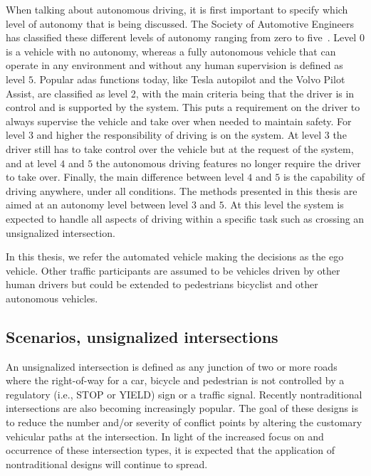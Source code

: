 When talking about autonomous driving, it is first important to specify which level of autonomy that is being discussed. The Society of Automotive Engineers has classified these different levels of autonomy ranging from zero to five~\cite{SAE2021}. Level $0$ is a vehicle with no autonomy, whereas a fully autonomous vehicle that can operate in any environment and without any human supervision is defined as level $5$. Popular \gls{adas} functions today, like Tesla autopilot and the Volvo Pilot Assist, are classified as level 2, with the main criteria being that the driver is in control and is supported by the system. This puts a requirement on the driver to always supervise the vehicle and take over when needed to maintain safety. For level $3$ and higher the responsibility of driving is on the system. At level $3$ the driver still has to take control over the vehicle but at the request of the system, and at level $4$ and $5$ the autonomous driving features no longer require the driver to take over. Finally, the main difference between level $4$ and $5$ is the capability of driving anywhere, under all conditions. 
The methods presented in this thesis are aimed at an autonomy level between level $3$ and $5$. At this level the system is expected to handle all aspects of driving within a specific task such as crossing an unsignalized intersection. 

In this thesis, we refer the automated vehicle making the decisions as the ego vehicle.
Other traffic participants are assumed to be vehicles driven by other human drivers but could be extended to pedestrians bicyclist and other autonomous vehicles. 

\subsection{Scenarios, unsignalized intersections}
An unsignalized intersection is defined as any junction of two or more roads where the right-of-way for a car, bicycle and pedestrian is not controlled by a regulatory (i.e., STOP or YIELD) sign or a traffic signal.
Recently nontraditional intersections are also becoming increasingly popular. The goal of these designs is to reduce the number and/or severity of conflict points by altering the customary vehicular paths at the intersection. In light of the increased focus on and occurrence of these intersection types, it is expected that the application of nontraditional designs will continue to spread.

